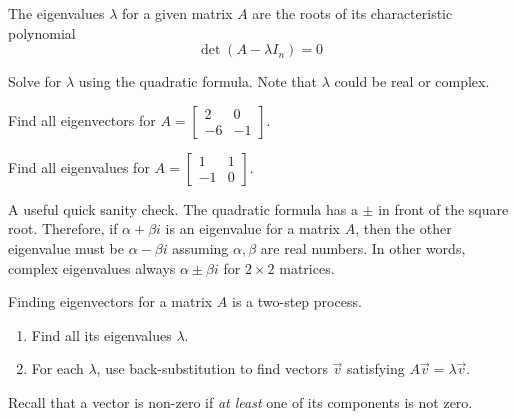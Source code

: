 \documentclass[../main.tex]{subfiles}
\begin{document}
\begin{method} \label{method:eigenvalues}
  The eigenvalues \(\lambda\) for a given matrix \(A\) are the roots of its characteristic polynomial
  \begin{equation} \label{eq:char-poly}
    \det(A - \lambda I_{n}) = 0
  \end{equation}

  Solve for \(\lambda\) using the quadratic formula. Note that \(\lambda\) could be real or complex.
\end{method}

\begin{example} \label{ex:eigenvalues-real}
  Find all eigenvectors for \(A = \begin{bmatrix} 2 & 0 \\ -6 & -1 \end{bmatrix}\).

\end{example}

\begin{example} \label{ex:eigenvalues-complex}
  Find all eigenvalues for \(A = \begin{bmatrix} 1 & 1 \\ -1 & 0 \end{bmatrix}\).

\end{example}

{\footnotesize \faExclamationTriangle{} A useful quick sanity check. The quadratic formula has a \(\pm\) in front of the square root. Therefore, if \(\alpha + \beta i\) is an eigenvalue for a matrix \(A\), then the other eigenvalue must be \(\alpha - \beta i\) assuming \(\alpha,\beta\) are real numbers.  In other words, complex eigenvalues always  \(\alpha \pm \beta i\) for \(2 \times 2\) matrices.} 
\clearpage

\begin{method} \label{method:eigenvectors}
  Finding eigenvectors for a matrix \(A\) is a two-step process.
  \begin{enumerate}
    \item Find all its eigenvalues \(\lambda\). 
    \item For each \(\lambda\), use back-substitution to find  vectors \(\vec{v}\) satisfying \(A \vec{v} = \lambda \vec{v}\). 
  \end{enumerate}

  Recall that a vector is non-zero if \emph{at least} one of its components is not zero.
\end{method}
\end{document}
